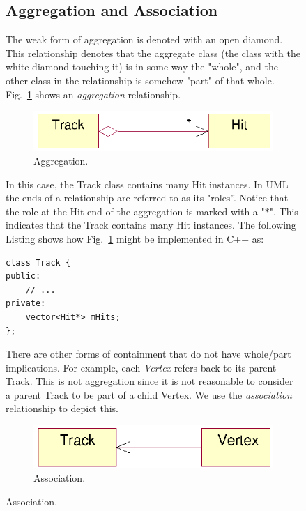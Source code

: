 \documentclass[twoside]{article}
\newcommand{\name}[1]{\textsl{#1}}%
\begin{document}
\begin{figure}[htb]
\begin{center}
\subsection{Aggregation and Association}

The weak form of aggregation is denoted with an open diamond. This
relationship denotes that the aggregate class (the class with the
white diamond touching it) is in some way the "whole", and the other
class in the relationship is somehow "part" of that whole.
Fig.~\ref{fig:umlAggregation} shows an \emph{aggregation}
relationship.
\begin{figure}[htb]
    \begin{center}
        \includegraphics{umlAggregation.eps}
        \caption{Aggregation.}
        \label{fig:umlAggregation}
    \end{center}
\end{figure}
In this case, the Track class contains many Hit instances. In UML the
ends of a relationship are referred to as its "roles''. Notice that
the role at the Hit end of the aggregation is marked with a "$*$".
This indicates that the Track contains many Hit instances.  The
following Listing shows how Fig.~\ref{fig:umlAggregation} might be
implemented in C++ as:

{\footnotesize
\begin{verbatim}
class Track {
public:
    // ...
private:
    vector<Hit*> mHits;
};
\end{verbatim}
}%

There are other forms of containment that do not have whole/part
implications. For example, each \name{Vertex} refers back to its
parent Track. This is not aggregation since it is not reasonable to
consider a parent Track to be part of a child Vertex. We use the
\emph{association} relationship to depict this.

\begin{figure}[htb]
    \begin{center}
        \includegraphics{umlAssociation.eps}
        \caption{Association.}
        \label{fig:umlAssociation}
    \end{center}
\end{figure}


\end{center}
\end{figure}
\end{document}
